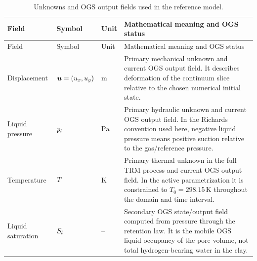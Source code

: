 \begingroup
\small
\setlength{\tabcolsep}{3pt}
\begin{longtable}{@{}L{0.20\textwidth} L{0.16\textwidth} L{0.16\textwidth} L{0.38\textwidth}@{}}
\caption{Unknowns and OGS output fields used in the reference model.}
\label{tab:unknown-output-fields}\\
\toprule
Field & Symbol & Unit & Mathematical meaning and OGS status\\
\midrule
\endfirsthead
\toprule
Field & Symbol & Unit & Mathematical meaning and OGS status\\
\midrule
\endhead
\bottomrule
\endlastfoot
Displacement &
\(\bm{u}=(u_x,u_y)\) &
\(\mathrm{m}\) &
Primary mechanical unknown and current OGS output field.  It describes deformation of
the continuum slice relative to the chosen numerical initial state.\\
Liquid pressure &
\(p_l\) &
\(\mathrm{Pa}\) &
Primary hydraulic unknown and current OGS output field.  In the Richards convention
used here, negative liquid pressure means positive suction relative to the
gas/reference pressure.\\
Temperature &
\(T\) &
\(\mathrm{K}\) &
Primary thermal unknown in the full TRM process and current OGS output field.  In the
active parametrization it is constrained to \(T_0=298.15\,\mathrm{K}\) throughout the
domain and time interval.\\
Liquid saturation &
\(S_l\) &
-- &
Secondary OGS state/output field computed from pressure through the retention law.
It is the mobile OGS liquid occupancy of the pore volume, not total
hydrogen-bearing water in the clay.\\
\end{longtable}
\endgroup

